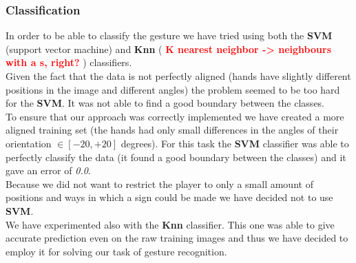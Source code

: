 \documentclass[a4paper, 11pt, twocolumn]{article}
\newcommand{\todo}[1]{\textcolor{red}{\textbf{#1}}}
\begin{document}
		\subsubsection{Classification}
		In order to be able to classify the gesture we have tried using both the \textbf{SVM} (support vector machine) and \textbf{Knn} ( \todo{K nearest neighbor -> neighbours with a s, right? }) classifiers.\\
		\hspace*{10px}Given the fact that the data is not perfectly aligned (hands have slightly different positions in the image and different angles) the problem seemed to be too hard for the \textbf{SVM}. It was not able to find a good boundary between the classes.\\
		\hspace*{10px}To ensure that our approach was correctly implemented we have created a more aligned training set (the hands had only small differences in the angles of their orientation $ \in [-20, +20]$ degrees). For this task the \textbf{SVM} classifier was able to perfectly classify the data (it found a good boundary between the classes) and it gave an error of \emph{0.0}.\\
		\hspace*{10px}Because we did not want to restrict the player to only a small amount of positions and ways in which a sign could be made we have decided not to use \textbf{SVM}.\\
		\hspace*{10px}We have experimented also with the \textbf{Knn} classifier. This one was able to give accurate prediction even on the raw training images and thus we have decided to employ it for solving our task of gesture recognition.
\end{document}
